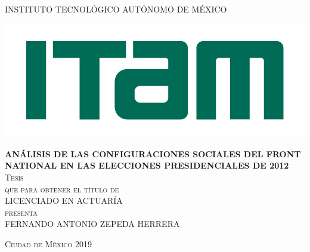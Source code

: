 \begin{titlepage}

\begin{center}

\large{INSTITUTO TECNOLÓGICO AUTÓNOMO DE MÉXICO}\\

\begin{center}
	\includegraphics[scale=0.8]{Figs/logo-ITAM.pdf}
\end{center}

\textsc{\large \textbf{ANÁLISIS DE LAS CONFIGURACIONES SOCIALES DEL FRONT NATIONAL EN LAS ELECCIONES PRESIDENCIALES DE 2012}}\\[2em]

\textsc{\large Tesis}\\[1em]

\textsc{que para obtener el título de}\\[1em]

\textsc{LICENCIADO EN ACTUARÍA}\\[1em]

\textsc{presenta}\\[1em]

\textsc{\Large FERNANDO ANTONIO ZEPEDA HERRERA}\\[1em]

\end{center}

\vspace*{\fill}
\textsc{Ciudad de México \hspace*{\fill} 2019}

\end{titlepage}